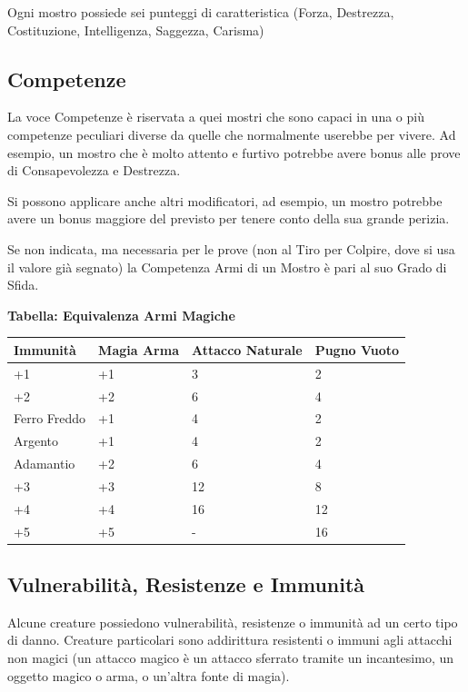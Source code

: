 \begin{multicols}{2}
Ogni mostro possiede sei punteggi di caratteristica (Forza, Destrezza, Costituzione, Intelligenza, Saggezza, Carisma)

\subsection{Competenze}

La voce Competenze è riservata a quei mostri che sono capaci in una o più competenze peculiari diverse da quelle che normalmente userebbe per vivere. Ad esempio, un mostro che è molto attento e furtivo potrebbe avere bonus alle prove di Consapevolezza e Destrezza.

Si possono applicare anche altri modificatori, ad esempio, un mostro potrebbe avere un bonus maggiore del previsto per tenere conto della sua grande perizia.

Se non indicata, ma necessaria per le prove (non al Tiro per Colpire, dove si usa il valore già segnato) la Competenza Armi di un Mostro è pari al suo Grado di Sfida.

\medskip

\textbf{Tabella: Equivalenza Armi Magiche}\label{equivalenzaarmimagiche}\hypertarget{equivalenzaarmimagiche}{}

\medskip

\noindent\begin{tabularx}{\linewidth}{lXXX}
		\toprule
 \rowcolor{gray!20}\textbf{Immunità} & \textbf{Magia Arma} & \textbf{Attacco Naturale}& \textbf{Pugno Vuoto}\\
	\toprule
	+1 & +1 & 3& 2\\
 \rowcolor{gray!20}+2 & +2 & 6& 4\\
	Ferro Freddo & +1 & 4& 2\\
 \rowcolor{gray!20}Argento & +1 & 4& 2\\
	Adamantio & +2 & 6& 4\\
 \rowcolor{gray!20}+3 & +3 & 12& 8\\
	+4 & +4 & 16& 12\\
 \rowcolor{gray!20}+5 & +5 & - & 16
\end{tabularx}

\subsection{Vulnerabilità, Resistenze e Immunità}\label{vulnerabilitaresistenze}
Alcune creature possiedono vulnerabilità, resistenze o immunità ad un certo tipo di danno. Creature particolari sono addirittura resistenti o immuni agli attacchi non magici (un attacco magico è un attacco sferrato tramite un incantesimo, un oggetto magico o arma, o un'altra fonte di magia).


\end{multicols}

